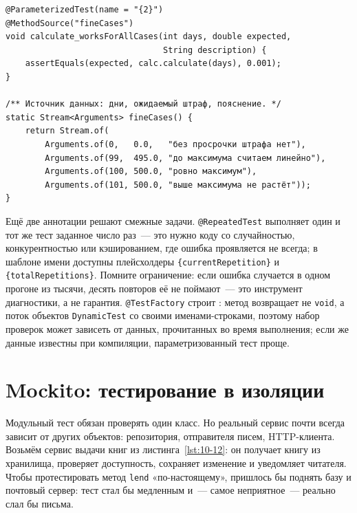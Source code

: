 \begin{listing}[H]
\begin{verbatim}
@ParameterizedTest(name = "{2}")
@MethodSource("fineCases")
void calculate_worksForAllCases(int days, double expected,
                                String description) {
    assertEquals(expected, calc.calculate(days), 0.001);
}

/** Источник данных: дни, ожидаемый штраф, пояснение. */
static Stream<Arguments> fineCases() {
    return Stream.of(
        Arguments.of(0,   0.0,   "без просрочки штрафа нет"),
        Arguments.of(99,  495.0, "до максимума считаем линейно"),
        Arguments.of(100, 500.0, "ровно максимум"),
        Arguments.of(101, 500.0, "выше максимума не растёт"));
}
\end{verbatim}
\caption{Источник @MethodSource с описанием каждого случая}
\label{lst:10-11}
\end{listing}

Ещё две аннотации решают смежные задачи. \texttt{@RepeatedTest} выполняет один и тот же тест заданное число раз~--- это нужно коду со случайностью, конкурентностью или кэшированием, где ошибка проявляется не всегда; в шаблоне имени доступны плейсхолдеры \texttt{\{currentRepetition\}} и \texttt{\{totalRepetitions\}}. Помните ограничение: если ошибка случается в одном прогоне из тысячи, десять повторов её не поймают~--- это инструмент диагностики, а не гарантия. \texttt{@TestFactory} строит : метод возвращает не \texttt{void}, а поток объектов \texttt{DynamicTest} со своими именами-строками, поэтому набор проверок может зависеть от данных, прочитанных во время выполнения; если же данные известны при компиляции, параметризованный тест проще.

\section{Mockito: тестирование в изоляции}

Модульный тест обязан проверять один класс. Но реальный сервис почти всегда зависит от других объектов: репозитория, отправителя писем, HTTP-клиента. Возьмём сервис выдачи книг из листинга~\ref{lst:10-12}: он получает книгу из хранилища, проверяет доступность, сохраняет изменение и уведомляет читателя. Чтобы протестировать метод \texttt{lend} «по-настоящему», пришлось бы поднять базу и почтовый сервер: тест стал бы медленным и~--- самое неприятное~--- реально слал бы письма.

